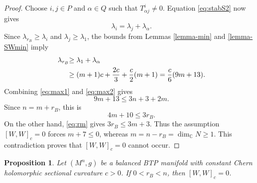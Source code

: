 \documentclass{amsart}
\newtheorem{proposition}{Proposition}
\newcommand{\C}{{\mathbb C}}
\begin{document}
\begin{proof}
{Choose } $i,j\in P$ and   {$\alpha\in Q$ such that
$T^i_{\alpha j}\neq0$. Equation \eqref{eq:stabS2} now gives
}\[
{\lambda_i=\lambda_j+\lambda_\alpha.
}\]
{Since $\lambda_{r_B}\geq\lambda_i$ and $\lambda_j\geq\lambda_1$, the
bounds from Lemmas \ref{lemma-min} and \ref{lemma-SWmin} imply
}\begin{align}
{\lambda_{r_B}
 }&{\geq\lambda_1+\lambda_\alpha \notag}\\
 &{\geq (m+1)c+\frac{2c}{3}
       +\frac{c}{2}(m+1)
 =\frac{c}{6}(9m+13).
 \label{eq:max2}
}\end{align}
{Combining \eqref{eq:max1} and \eqref{eq:max2} gives
}\[
{9m+13\leq3n+3+2m.
}\]
{Since $n=m+r_B$, this is
}\[
{4m+10\leq3r_B.
}\]
 On the other hand,  {\eqref{eq:rm} gives $3r_B\leq3m+3$. Thus the
assumption $[W,W]_c=0$ forces $m+7\leq0$, whereas
$m=n-r_B=\dim_{\C}N\geq1$. This contradiction proves that
$[W,W]_c=0$ cannot occur.}
\end{proof}


\begin{proposition}\label{prop3}
Let $(M^n,g)$ be a balanced BTP manifold with constant Chern
holomorphic sectional curvature $c>0$. If $0<r_B<n$, then
$[W,W]_c=0$.
\end{proposition}
\end{document}
